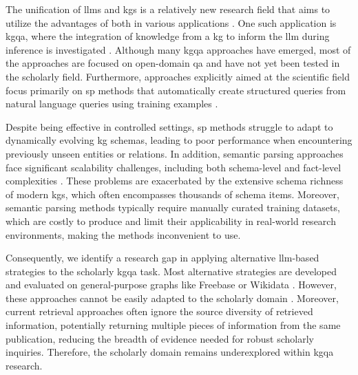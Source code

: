 The unification of \glspl{llm} and \glspl{kg} is a relatively new research field that aims to utilize the advantages of both in various applications \cite{pan_unifying_2024}. One such application is \gls{kgqa}, where the integration of knowledge from a \gls{kg} to inform the \gls{llm} during inference is investigated \cite{banerjee_knowledge_2024,chakraborty_introduction_2021,chakraborty_introduction_2019,pan_unifying_2024,yani_better_2022,peng_graph_2024,jin_large_2024,feng_trends_2023,li_survey_2024,agrawal_can_2024,procko_graph_2024}. 
Although many \gls{kgqa} approaches have emerged, most of the approaches are focused on open-domain \gls{qa} and have not yet been tested in the scholarly field. Furthermore, approaches explicitly aimed at the scientific field focus primarily on \gls{sp} methods that automatically create structured queries from natural language queries using training examples \cite{banerjee_dblp-quad_2023, taffa_leveraging_2023, lehmann_large_2024, jiang_structure_2023, jaradeh_question_2020}. 

Despite being effective in controlled settings, \gls{sp} methods struggle to adapt to dynamically evolving \gls{kg} schemas, leading to poor performance when encountering previously unseen entities or relations. In addition, semantic parsing approaches face significant scalability challenges, including both schema-level and fact-level complexities \cite{gu_knowledge_2022}. These problems are exacerbated by the extensive schema richness of modern \glspl{kg}, which often encompasses thousands of schema items. Moreover, semantic parsing methods typically require manually curated training datasets, which are costly to produce and limit their applicability in real-world research environments, making the methods inconvenient to use. 

Consequently, we identify a research gap in applying alternative \gls{llm}-based strategies to the scholarly \gls{kgqa} task. Most alternative strategies are developed and evaluated on general-purpose graphs like Freebase or Wikidata \cite{peng_graph_2024}. However, these approaches cannot be easily adapted to the scholarly domain \cite{saikh_scienceqa_2022}. Moreover, current retrieval approaches often ignore the source diversity of retrieved information, potentially returning multiple pieces of information from the same publication, reducing the breadth of evidence needed for robust scholarly inquiries. Therefore, the scholarly domain remains underexplored within \gls{kgqa} research.

